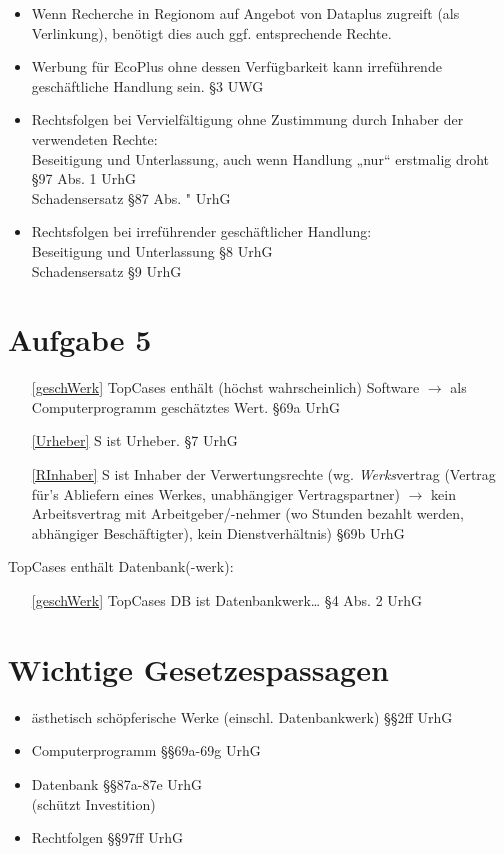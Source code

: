 \documentclass{scrreprt}
\begin{document}
\begin{anumerate}
\begin{itemize}
\item Wenn Recherche in Regionom auf Angebot von Dataplus zugreift (als Verlinkung), benötigt dies auch ggf. entsprechende Rechte.
\item Werbung für EcoPlus ohne dessen Verfügbarkeit kann irreführende geschäftliche Handlung sein. \hfill §3 UWG
\item Rechtsfolgen bei Vervielfältigung ohne Zustimmung durch Inhaber der verwendeten Rechte:\\
Beseitigung und Unterlassung, auch wenn Handlung „nur“ erstmalig droht \hfill §97 Abs. 1 UrhG\\
Schadensersatz \hfill §87 Abs. " UrhG
\item Rechtsfolgen bei irreführender geschäftlicher Handlung:\\
Beseitigung und Unterlassung \hfill §8 UrhG\\
Schadensersatz \hfill §9 UrhG
\end{itemize}
\end{anumerate}

\chapter{Aufgabe 5}
\begin{itemize}
\item[\ref{geschWerk}] TopCases enthält (höchst wahrscheinlich) Software $\to$ als Computerprogramm geschätztes Wert. \hfill §69a UrhG
\item[\ref{Urheber}] S ist Urheber. \hfill §7 UrhG
\item[\ref{RInhaber}] S ist Inhaber der Verwertungsrechte (wg. \emph{Werks}vertrag (Vertrag für's Abliefern eines Werkes, unabhängiger Vertragspartner) $\to$ kein Arbeitsvertrag mit Arbeitgeber/-nehmer (wo Stunden bezahlt werden, abhängiger Beschäftigter), kein Dienstverhältnis) \hfill §69b UrhG
\end{itemize}
TopCases enthält Datenbank(-werk):
\begin{itemize}
\item[\ref{geschWerk}] TopCases DB ist Datenbankwerk… \hfill §4 Abs. 2 UrhG
\end{itemize}
\begin{anumerate}
\item 
\end{anumerate}







\chapter{Wichtige Gesetzespassagen}
\begin{itemize}
\item ästhetisch schöpferische Werke (einschl. Datenbankwerk) \hfill §§2ff UrhG
\item Computerprogramm \hfill §§69a-69g UrhG
\item Datenbank \hfill §§87a-87e UrhG\\
(schützt Investition)
\item Rechtfolgen \hfill §§97ff UrhG
\end{itemize}
\end{document}
